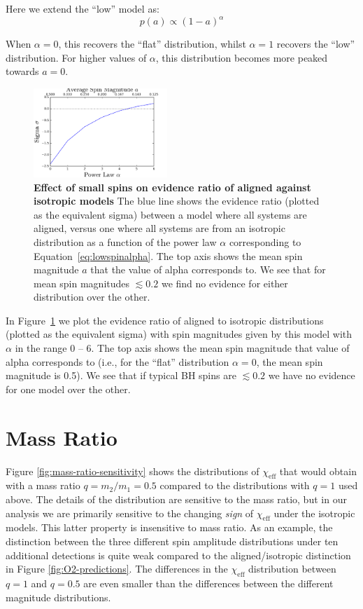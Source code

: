 \documentclass[modern,linenumbers]{aastex61}
\newcommand{\chieff}{\chi_\mathrm{eff}}
\begin{document}
Here we extend the ``low'' model as:
%
\begin{equation}
p(a) \propto (1 - a)^{\alpha}
\label{eq:lowspinalpha}
\end{equation}
%

When $\alpha = 0$, this recovers the ``flat'' distribution, whilst $\alpha = 1$
recovers the ``low'' distribution. For higher values of $\alpha$, this distribution 
becomes more peaked towards $a = 0$.

%
\begin{figure}
\centering
\includegraphics[width=0.45\textwidth]{../plots/sigma_v_alpha.png}
\caption{\textbf{Effect of small spins on evidence ratio of aligned against isotropic models} The blue line shows the evidence ratio (plotted as the equivalent sigma) between a model where all systems are aligned, versus one where all systems are from an isotropic distribution as a function of the power law $\alpha$ corresponding to Equation~\ref{eq:lowspinalpha}.  The top axis shows the mean spin magnitude $a$
that the value of alpha corresponds to. We see that for mean spin magnitudes $\lesssim 0.2$ we find no evidence for either distribution over the other.}
\label{fig:smallspinsalpha}
\end{figure}
%

In Figure~\ref{fig:smallspinsalpha} we plot the evidence ratio of aligned to isotropic distributions (plotted as the equivalent sigma) with spin magnitudes given by this model with $\alpha$ in the range $0$ -- $6$. The top axis shows the mean spin magnitude
that value of alpha corresponds to (i.e., for the ``flat'' distribution $\alpha = 0$, the mean spin magnitude is 0.5). We see that if typical BH spins are $\lesssim 0.2$ we have no evidence for one model over the other.

\section{Mass Ratio}
\label{sec:mass-ratio}

Figure \ref{fig:mass-ratio-sensitivity} shows the distributions of
$\chieff$ that would obtain with a mass ratio $q = m_2/m_1 = 0.5$
compared to the distributions with $q = 1$ used above.  The details of
the distribution are sensitive to the mass ratio, but in our analysis
we are primarily sensitive to the changing \emph{sign} of $\chieff$
under the isotropic models.  This latter property is insensitive to
mass ratio.  As an example, the distinction between the three
different spin amplitude distributions under ten additional detections
is quite weak compared to the aligned/isotropic distinction in Figure
\ref{fig:O2-predictions}.  The differences in the $\chieff$
distribution between $q = 1$ and $q = 0.5$ are even smaller than the
differences between the different magnitude distributions.
\end{document}
